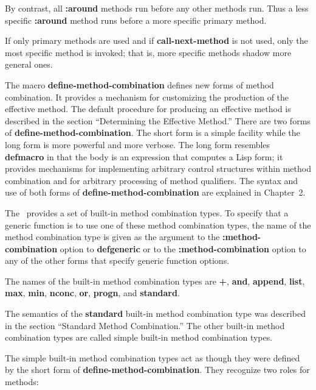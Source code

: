 By contrast, all {\bf :around} methods run before any other methods
run.  Thus a less specific {\bf :around} method runs before a more
specific primary method.

If only primary methods are used and if {\bf call-next-method} is not
used, only the most specific method is invoked; that is, more specific
methods shadow more general ones. 

\endsubSection%


The macro {\bf define-method-combination} defines new forms of method
combination.  It provides a mechanism for customizing the production
of the effective method. The default procedure for producing an
effective method is described in the section ``Determining the
Effective Method.''  There are two forms of {\bf
define-method-combination}.  The short form is a simple facility while
the long form is more powerful and more verbose.  The long form
resembles {\bf defmacro} in that the body is an expression that
computes a Lisp form; it provides mechanisms for implementing
arbitrary control structures within method combination and for
arbitrary processing of method qualifiers.  The syntax and use of both
forms of {\bf define-method-combination} are explained in Chapter~2.

\endsubSection%

\goodbreak


The \CLOS\ provides a set of built-in method combination types.  To
specify that a generic function is to use one of these method
combination types, the name of the method combination type is given as
the argument to the {\bf :method-combination} option to {\bf
defgeneric} or to the {\bf :method-combination} option to any of the
other forms that specify generic function options.

The names of the built-in  method combination types are
{\bf +}, {\bf and}, {\bf append}, {\bf list}, {\bf max}, {\bf min}, 
{\bf nconc}, {\bf or}, {\bf progn}, and {\bf standard}.

The semantics of the {\bf standard} built-in method combination type was
described in the section ``Standard Method Combination.''  The other
built-in method combination types are called {\bit simple built-in method
combination types.}

The simple built-in method combination types act as though they were
defined by the short form of {\bf define-method-combination}.  They
recognize two roles for methods:


